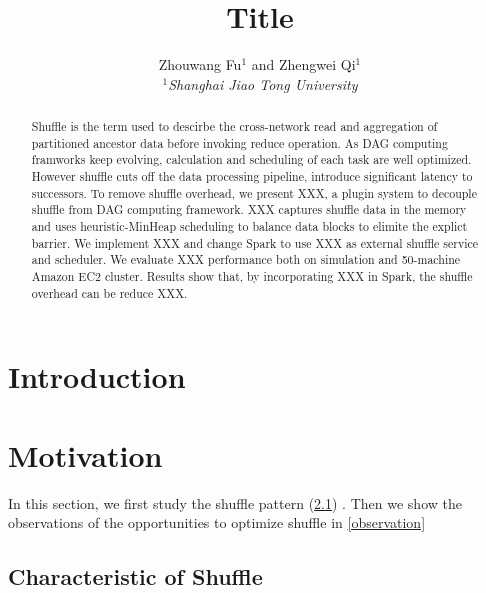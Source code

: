 \documentclass[10pt,twocolumn]{article}
\begin{document}
\title{Title}
\author{Zhouwang Fu$^1$ and Zhengwei Qi$^1$ \\
\small {\em  $^1$Shanghai Jiao Tong University} \\ [2mm]
}
\date{}
\maketitle

\begin{abstract}

Shuffle is the term used to descirbe the cross-network read and aggregation
of partitioned ancestor data before invoking reduce operation.
As DAG computing framworks keep evolving, calculation and scheduling of each task are well optimized. 
However shuffle cuts off the data processing pipeline, introduce significant latency to successors.
To remove shuffle overhead, we present XXX, a plugin system to decouple shuffle from DAG computing 
framework. XXX captures shuffle data in the memory and uses heuristic-MinHeap scheduling to balance data
blocks to elimite the explict barrier. We implement XXX and change Spark to use XXX as external shuffle 
 service and scheduler. We evaluate XXX performance both on simulation and 50-machine Amazon EC2 cluster.
 Results show that, by incorporating XXX in Spark, the shuffle overhead can be reduce XXX.

\end{abstract}

\section{Introduction}

\section{Motivation}

In this section, we first study the shuffle pattern (\ref{shuffle pattern}) . 
Then we show the observations of the opportunities to optimize shuffle in \ref{observation}
\subsection{Characteristic of Shuffle} \label{shuffle pattern}
\end{document}
